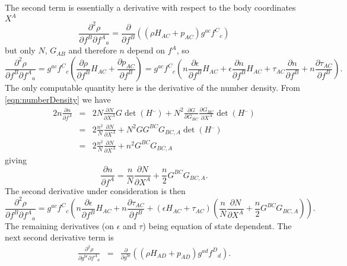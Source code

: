 The second term is essentially a derivative with respect to the body coordinates $X^A$
\begin{equation}
\frac{\partial^2 \rho}{\partial f^B \partial f^A{}_a} = \frac{\partial}{\partial f^B }\left(\left( \rho H_{AC} + p_{AC} \right)g^{ac}f^{C}{}_c\right)
\end{equation}
but only $N$, $G_{AB}$ and therefore $n$ depend on $f^A$, so
\begin{equation}
\frac{\partial^2 \rho}{\partial f^B \partial f^A{}_a} = g^{ac}f^{C}{}_c\left( \frac{\partial \rho}{\partial f^B } H_{AC} + \frac{\partial p_{AC}}{\partial f^B } \right) = g^{ac}f^{C}{}_c\left( n\frac{\partial \epsilon}{\partial f^B } H_{AC} + \epsilon\frac{\partial n}{\partial f^B } H_{AC} + \tau_{AC} \frac{\partial n}{\partial f^B } + n\frac{\partial \tau_{AC}}{\partial f^B } \right).
\end{equation}
The only computable quantity here is the derivative of the number density. From \eqref{eqn:numberDensity} we have
\begin{eqnarray}
2n\frac{\partial n}{\partial f^A} & =& 2N\frac{\partial N}{\partial X^A} G\det(H^{..}) + N^2\frac{\partial G}{\partial G_{BC}}\frac{\partial G_{BC}}{\partial X^A}\det(H^{..})\\
 & = & 2 \frac{n^2}{N}\frac{\partial N}{\partial X^A} + N^2GG^{BC}G_{BC,A}\det(H^{..}) \\
 & = & 2 \frac{n^2}{N}\frac{\partial N}{\partial X^A} + n^2 G^{BC}G_{BC,A}
\end{eqnarray}
giving
\begin{equation}
\frac{\partial n}{\partial f^A} = \frac{n}{N}\frac{\partial N}{\partial X^A} + \frac{n}{2}G^{BC}G_{BC,A}.
\end{equation}
The second derivative under consideration is then
\begin{equation}
\frac{\partial^2 \rho}{\partial f^B \partial f^A{}_a} = g^{ac}f^{C}{}_c\left( n\frac{\partial \epsilon}{\partial f^B } H_{AC} + n\frac{\partial \tau_{AC}}{\partial f^B } + \left(\epsilon H_{AC} + \tau_{AC} \right)\left( \frac{n}{N}\frac{\partial N}{\partial X^A} + \frac{n}{2}G^{BC}G_{BC,A}\right) \right).
\end{equation}
The remaining derivatives (on $\epsilon$ and $\tau$) being equation of state dependent. The next second derivative term is
\begin{eqnarray}
\frac{\partial^2 \rho}{\partial g^{bc} \partial f^A{}_a } & = & \frac{\partial}{\partial g^{bc} }\left(\left( \rho H_{AD} + p_{AD} \right)g^{ad}f^{D}{}_d\right).
\end{eqnarray}
